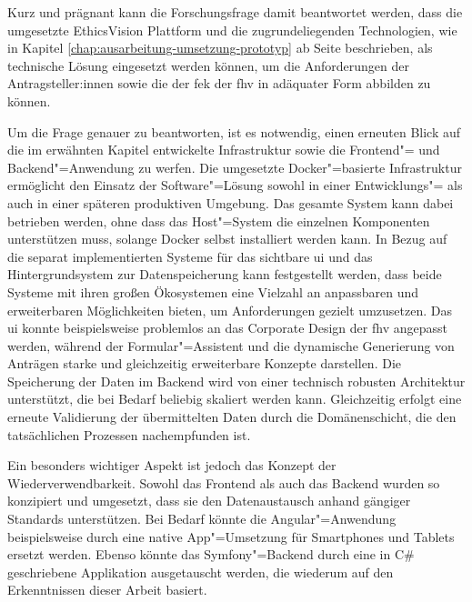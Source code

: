 \documentclass[a4paper,12pt,twoside,numbers=noendperiod]{scrreprt}
\begin{document}
\medskip

Kurz und prägnant kann die Forschungsfrage damit beantwortet werden, dass die umgesetzte EthicsVision Plattform und die zugrundeliegenden Technologien, wie in Kapitel \ref{chap:ausarbeitung-umsetzung-prototyp} ab Seite \pageref{chap:ausarbeitung-umsetzung-prototyp} beschrieben, als technische Lösung eingesetzt werden können, um die Anforderungen der Antragsteller:innen sowie die der \acl{fek} der \acl{fhv} in adäquater Form abbilden zu können.

\smallskip

Um die Frage genauer zu beantworten, ist es notwendig, einen erneuten Blick auf die im erwähnten Kapitel entwickelte Infrastruktur sowie die Frontend"= und Backend"=Anwendung zu werfen. Die umgesetzte Docker"=basierte Infrastruktur ermöglicht den Einsatz der Software"=Lösung sowohl in einer Entwicklungs"= als auch in einer späteren produktiven Umgebung. Das gesamte System kann dabei betrieben werden, ohne dass das Host"=System die einzelnen Komponenten unterstützen muss, solange Docker selbst installiert werden kann. In Bezug auf die separat implementierten Systeme für das sichtbare \ac{ui} und das Hintergrundsystem zur Datenspeicherung kann festgestellt werden, dass beide Systeme mit ihren großen Ökosystemen eine Vielzahl an anpassbaren und erweiterbaren Möglichkeiten bieten, um Anforderungen gezielt umzusetzen. Das \ac{ui} konnte beispielsweise problemlos an das Corporate Design der \ac{fhv} angepasst werden, während der Formular"=Assistent und die dynamische Generierung von Anträgen starke und gleichzeitig erweiterbare Konzepte darstellen. Die Speicherung der Daten im Backend wird von einer technisch robusten Architektur unterstützt, die bei Bedarf beliebig skaliert werden kann. Gleichzeitig erfolgt eine erneute Validierung der übermittelten Daten durch die Domänenschicht, die den tatsächlichen Prozessen nachempfunden ist.

Ein besonders wichtiger Aspekt ist jedoch das Konzept der Wiederverwendbarkeit. Sowohl das Frontend als auch das Backend wurden so konzipiert und umgesetzt, dass sie den Datenaustausch anhand gängiger Standards unterstützen. Bei Bedarf könnte die Angular"=Anwendung beispielsweise durch eine native App"=Umsetzung für Smartphones und Tablets ersetzt werden. Ebenso könnte das Symfony"=Backend durch eine in C\# geschriebene Applikation ausgetauscht werden, die wiederum auf den Erkenntnissen dieser Arbeit basiert.

\medskip
\end{document}
